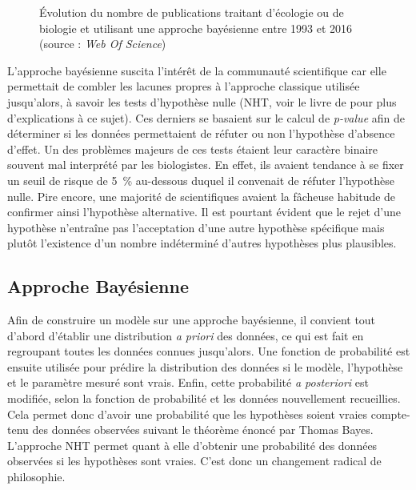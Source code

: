 \documentclass[11pt,twocolumn,twoside]{bopHomework}
\begin{document}
\begin{figure}[h]
  \centering{\graphfont}
  \caption{Évolution du nombre de publications traitant d'écologie ou de
    biologie et utilisant une approche bayésienne entre 1993 et 2016 (source :
    \textit{Web Of Science})}
  \label{fig:bibliometry}
\end{figure}

L'approche bayésienne suscita l'intérêt de la communauté scientifique car elle
permettait de combler les lacunes propres à l'approche classique utilisée
jusqu'alors, à savoir les tests d'hypothèse nulle (NHT, voir le livre de
\citet{fisher1925} pour plus d'explications à ce sujet).
Ces derniers se basaient sur le calcul de \textit{p-value} afin de déterminer si
les données permettaient de réfuter ou non l'hypothèse d'absence d'effet.
Un des problèmes majeurs de ces tests étaient leur caractère binaire souvent mal
interprété par les biologistes.
En effet, ils avaient tendance à se fixer un seuil de risque de 5~\% au-dessous
duquel il convenait de réfuter l'hypothèse nulle.
Pire encore, une majorité de scientifiques avaient la fâcheuse habitude de
confirmer ainsi l'hypothèse alternative.
Il est pourtant évident que le rejet d'une hypothèse n'entraîne pas
l'acceptation d'une autre hypothèse spécifique mais plutôt l'existence d'un
nombre indéterminé d'autres hypothèses plus plausibles.

\subsection{Approche Bayésienne}

Afin de construire un modèle sur une approche bayésienne, il convient tout
d'abord d'établir une distribution \textit{a priori} des données, ce qui est
fait en regroupant toutes les données connues jusqu'alors.
Une fonction de probabilité est ensuite utilisée pour prédire la distribution
des données si le modèle, l'hypothèse et le paramètre mesuré sont vrais.
Enfin, cette probabilité \textit{a posteriori} est modifiée, selon la fonction
de probabilité et les données nouvellement recueillies.
Cela permet donc d'avoir une probabilité que les hypothèses soient vraies
compte-tenu des données observées suivant le théorème énoncé par Thomas Bayes.
L'approche NHT permet quant à elle d'obtenir une probabilité des données
observées si les hypothèses sont vraies.
C'est donc un changement radical de philosophie.
\end{document}
